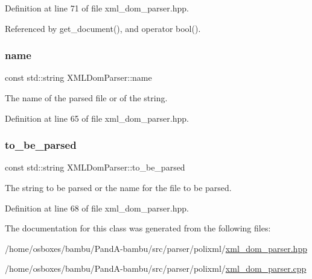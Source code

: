 Definition at line 71 of file xml\+\_\+dom\+\_\+parser.\+hpp.



Referenced by get\+\_\+document(), and operator bool().

\mbox{\label{classXMLDomParser_a81d9e7ce6d3eecff046287f925b93218}} 
\subsubsection{\texorpdfstring{name}{name}}
{\footnotesize\ttfamily const std\+::string X\+M\+L\+Dom\+Parser\+::name\hspace{0.3cm}{\ttfamily [protected]}}



The name of the parsed file or of the string. 



Definition at line 65 of file xml\+\_\+dom\+\_\+parser.\+hpp.

\mbox{\label{classXMLDomParser_ae7556f9c24b379dd9fbe397fa57bd187}} 
\subsubsection{\texorpdfstring{to\+\_\+be\+\_\+parsed}{to\_be\_parsed}}
{\footnotesize\ttfamily const std\+::string X\+M\+L\+Dom\+Parser\+::to\+\_\+be\+\_\+parsed\hspace{0.3cm}{\ttfamily [protected]}}



The string to be parsed or the name for the file to be parsed. 



Definition at line 68 of file xml\+\_\+dom\+\_\+parser.\+hpp.



The documentation for this class was generated from the following files\+:\begin{DoxyCompactItemize}
\item 
/home/osboxes/bambu/\+Pand\+A-\/bambu/src/parser/polixml/\hyperlink{xml__dom__parser_8hpp}{xml\+\_\+dom\+\_\+parser.\+hpp}\item 
/home/osboxes/bambu/\+Pand\+A-\/bambu/src/parser/polixml/\hyperlink{xml__dom__parser_8cpp}{xml\+\_\+dom\+\_\+parser.\+cpp}\end{DoxyCompactItemize}
